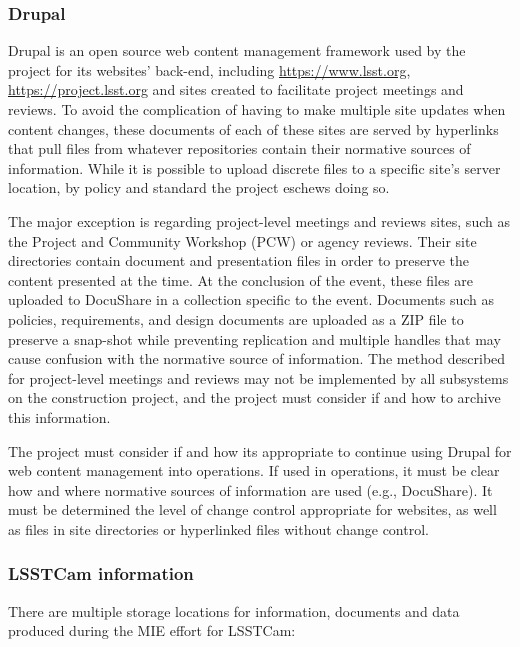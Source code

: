 \subsubsection{Drupal}

Drupal \citep{drupal-cite} is an open source web content management framework used by the project for its websites’ back-end, including \url{https://www.lsst.org}, \url{https://project.lsst.org} and sites created to facilitate project meetings and reviews.
To avoid the complication of having to make multiple site updates when content changes, these documents of each of these sites are served by hyperlinks that pull files from whatever repositories contain their normative sources of information.
While it is possible to upload discrete files to a specific site’s server location, by policy and standard the project eschews doing so.

The major exception is regarding project-level meetings and reviews sites, such as the Project and Community Workshop (PCW) or agency reviews.
Their site directories contain document and presentation files in order to preserve the content presented at the time.
At the conclusion of the event, these files are uploaded to DocuShare in a collection specific to the event.
Documents such as policies, requirements, and design documents are uploaded as a ZIP file to preserve a snap-shot while preventing replication and multiple handles that may cause confusion with the normative source of information.
The method described for project-level meetings and reviews may not be implemented by all subsystems on the construction project, and the project must consider if and how to archive this information.

The project must consider if and how its appropriate to continue using Drupal for web content management into operations.
If used in operations, it must be clear how and where normative sources of information are used (e.g., DocuShare).
It must be determined the level of change control appropriate for websites, as well as files in site directories or hyperlinked files without change control.

\subsubsection{LSSTCam information}

There are multiple storage locations for information, documents and data produced during the MIE effort for LSSTCam:



